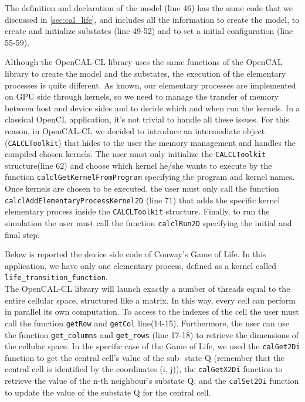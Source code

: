 The definition and declaration of the model (line 46) has the same code
that we discussed in \ref{sec:cal_life}, and includes all the information
to create the model, to create and initialize substates (line 49-52) and 
to set a initial configuration (line 55-59).


	
Although the OpenCAL-CL library uses the same functions of the OpenCAL
library to create the model and the substates, the execution of the
elementary processes is quite different. As known, our elementary
processes are implemented on GPU side through kernels, so we need to manage the
transfer of memory between host and device sides and to decide which and
when run the kernels. In a classical OpenCL application, it's not
trivial to handle all these issues. For this reason,
in OpenCAL-CL we decided to introduce an intermediate object
(\verb'CALCLToolkit') that hides to the user the memory management and handles the
compiled chosen kernels. The user must only initialize the
\verb'CALCLToolkit' structure(line 62) and choose which kernel he/she
wants to execute by the function \verb'calclGetKernelFromProgram'
specifying the program and kernel names. Once kernels are chosen to be executed,
the user must only call the function
\verb'calclAddElementaryProcessKernel2D' (line 71) that adds the
specific kernel elementary process inside the \verb'CALCLToolkit'
structure. Finally, to run the simulation the user must call the function
\verb'calclRun2D' specifying the initial and final step.

Below is reported the device side code of Conway's Game of
Life.  In this application, we have only one elementary process, defined as a kernel called
\verb'life_transition_function'.\\ The OpenCAL-CL library will launch
exactly a number of threads equal to the entire cellular space,
structured like a matrix. In this way, every cell can perform in parallel
its own computation. To access to the indexes of the cell the user
must call the function \verb'getRow' and \verb'getCol'
line(14-15). Furthermore, the user can use the function
\verb'get_columns' and \verb'get_rows' (line 17-18) to retrieve the
dimensions of the cellular space.  In the specific case of the Game of
Life, we used the \verb'calGet2Di' function to get the central cell’s value of the sub-
state Q (remember that the central cell is identified by the coordinates (i, j)), the \verb'calGetX2Di' function to retrieve the value
of the n-th neighbour’s substate Q, and the \verb'calSet2Di' function to update the
value of the substate Q for the central cell. 

